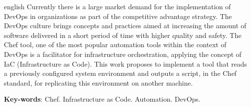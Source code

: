 \newpage\null\thispagestyle{empty}\newpage
\begin{resumo}[Abstract]
  \begin{otherlanguage*}{english}
    Currently there is a large market demand for the implementation
    of DevOps in organizations as part of the competitive advantage
    strategy. The DevOps culture brings concepts and practices aimed at increasing
    the amount of software delivered in a short period of time with higher quality
    and safety. The Chef tool, one of the most popular automation tools within the
    context of DevOps is a facilitator for infrastructure orchestration, applying
    the concept of IaC (Infrastructure as Code). This work proposes to implement a tool
    that reads a previously configured system environment and outputs a script,
    in the Chef standard, for replicating this environment on another machine.

    \vspace{\onelineskip}
    \noindent 
    \textbf{Key-words}: Chef. Infrastructure as Code. Automation. DevOps.
  \end{otherlanguage*}
\end{resumo}
